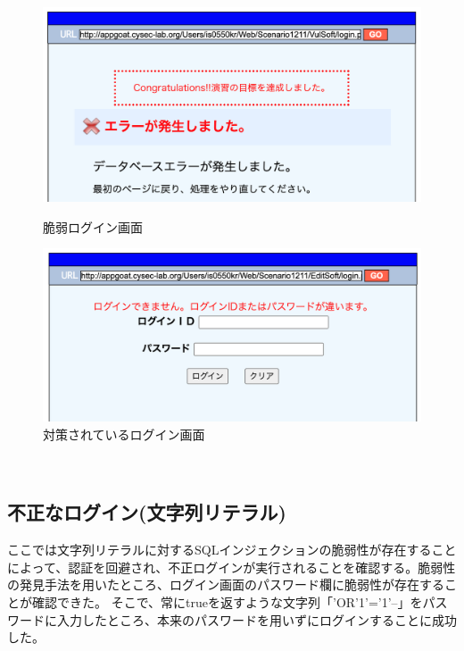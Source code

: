 \documentclass[dvipdfmx,autodetect-engine,titlepage]{jsarticle}
\begin{document}
\begin{figure}[H]
  \centering
  \begin{minipage}[b]{0.45\linewidth}
  \begin{center}
    \includegraphics[keepaspectratio,scale=0.32]{sql1.png}
    \end{center}
    \caption{脆弱ログイン画面}
  \end{minipage}
  \begin{minipage}[b]{0.45\linewidth}
  \begin{center}
    \includegraphics[keepaspectratio,scale=0.32]{sql2.png}
    \end{center}
    \caption{対策されているログイン画面}
  \end{minipage}
\end{figure}

　\\

\subsection{不正なログイン(文字列リテラル)}
ここでは文字列リテラルに対するSQLインジェクションの脆弱性が存在することによって、認証を回避され、不正ログインが実行されることを確認する。脆弱性の発見手法を用いたところ、ログイン画面のパスワード欄に脆弱性が存在することが確認できた。
そこで、常にtrueを返すような文字列「'OR'1'='1'–」をパスワードに入力したところ、本来のパスワードを用いずにログインすることに成功した。\\
\end{document}
